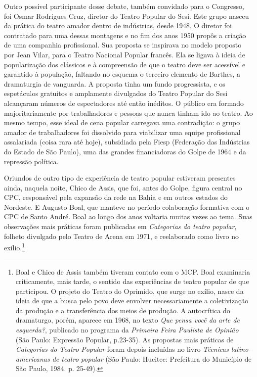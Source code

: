 Outro possível participante desse debate, também convidado para o
Congresso, foi Osmar Rodrigues Cruz, diretor do Teatro Popular do Sesi.
Este grupo nasceu da prática do teatro amador dentro de indústrias,
desde 1948. O diretor foi contratado para uma dessas montagens e no fim
dos anos 1950 propôs a criação de uma companhia profissional. Sua
proposta se inspirava no modelo proposto por Jean Vilar, para o Teatro
Nacional Popular francês. Ela se ligava à ideia de popularização dos
clássicos e à compreensão de que o teatro deve ser acessível e garantido
à população, faltando no esquema o terceiro elemento de Barthes, a
dramaturgia de vanguarda. A proposta tinha um fundo progressista, e os
espetáculos gratuitos e amplamente divulgados do Teatro Popular do Sesi
alcançaram números de espectadores até então inéditos. O público era
formado majoritariamente por trabalhadores e pessoas que nunca tinham
ido ao teatro. Ao mesmo tempo, esse ideal de cena popular carregava uma
contradição: o grupo amador de trabalhadores foi dissolvido para
viabilizar uma equipe profissional assalariada (coisa rara até hoje),
subsidiada pela Fiesp (Federação das Indústrias do Estado de São Paulo),
uma das grandes financiadoras do Golpe de 1964 e da repressão política.

Oriundos de outro tipo de experiência de teatro popular estiveram
presentes ainda, naquela noite, Chico de Assis, que foi, antes do Golpe,
figura central no CPC, responsável pela expansão da rede na Bahia e em
outros estados do Nordeste. E Augusto Boal, que manteve no período
colaboração formativa com o CPC de Santo André. Boal ao longo dos anos
voltaria muitas vezes ao tema. Suas observações mais práticas foram
publicadas em \textit{Categorias do teatro popular}, folheto divulgado pelo
Teatro de Arena em 1971, e reelaborado como livro no exílio.\footnote{Boal
  e Chico de Assis também tiveram contato com o MCP. Boal examinaria
  criticamente, mais tarde, o sentido das experiências de teatro popular
  de que participou. O projeto do Teatro do Oprimido, que surge no
  exílio, nasce da ideia de que a busca pelo povo deve envolver
  necessariamente a coletivização da produção e a transferência dos
  meios de produção. A autocrítica do dramaturgo, porém, aparece em
  1968, no texto \textit{Que pensa você da arte de esquerda?}, publicado no
  programa da \textit{Primeira Feira Paulista de Opinião} (São Paulo:
  Expressão Popular, p.23-35). As propostas mais práticas de
  \textit{Categorias do Teatro Popular} foram depois incluídas no livro
  \textit{Técnicas latino-americanas de teatro popular} (São Paulo:
  Hucitec: Prefeitura do Município de São Paulo, 1984. p. 25-49).}

